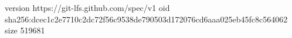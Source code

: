 version https://git-lfs.github.com/spec/v1
oid sha256:dcec1c2e7710c2dc72f56c9538de790503d172076cd6aaa025eb45fc8c564062
size 519681
